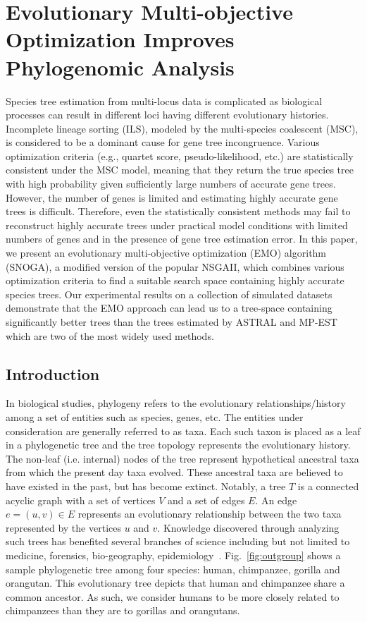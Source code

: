 \graphicspath{{snoga/}}
\chapter{Evolutionary Multi-objective Optimization Improves Phylogenomic Analysis}



	Species tree estimation from multi-locus data is complicated as biological processes can result in different loci having different evolutionary histories. Incomplete lineage sorting (ILS), modeled by the multi-species coalescent (MSC), is considered to be a dominant cause for gene tree incongruence. Various optimization criteria (e.g., quartet score, pseudo-likelihood, etc.) are statistically consistent under the MSC model, meaning that they return the true species tree with high probability given sufficiently large numbers of accurate gene trees. However, the number of genes is limited and estimating highly accurate gene trees is difficult. Therefore, even the statistically consistent methods may fail to reconstruct highly accurate trees under practical model conditions with limited numbers of genes and in the presence of gene tree estimation error. In this paper, we present an evolutionary multi-objective optimization (EMO) algorithm (SNOGA), a modified version of the popular NSGAII, which combines various optimization criteria to find a suitable search space containing highly accurate species trees. Our experimental results on a collection of simulated datasets demonstrate that the EMO approach can lead us to a tree-space containing significantly better trees than the trees estimated by ASTRAL and MP-EST which are two of the most widely used methods. 

 \section{Introduction}
\label{sec:intro}
In biological studies, phylogeny refers to the evolutionary relationships/history among a set of entities such as species, genes, etc. The entities under consideration are generally referred to as taxa. Each such taxon is placed as a leaf in a phylogenetic tree and the tree topology represents the evolutionary history. The non-leaf (i.e. internal) nodes of the tree represent hypothetical ancestral taxa from which the present day taxa evolved. These ancestral taxa are believed to have existed in the past, but has become extinct. Notably, a tree $T$ is a connected acyclic graph with a set of vertices $V$ and a set of edges $E$. An edge $e = (u, v) \in E$ represents an evolutionary relationship between the two taxa represented by the vertices $u$ and $v$. Knowledge discovered through analyzing such trees has benefited several branches of science including but not limited to medicine, forensics, bio-geography, epidemiology~\cite{felix2015phylogenetics}. 
Fig.~\ref{fig:outgroup} shows a sample phylogenetic tree among four species: human, chimpanzee, gorilla and orangutan. This evolutionary tree depicts that human and chimpanzee share a common ancestor. As such, we consider humans to be more closely related to chimpanzees than they are to gorillas and orangutans.

